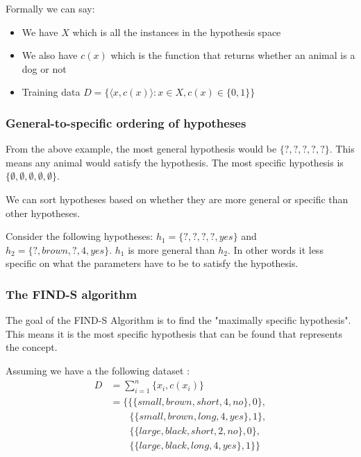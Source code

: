\documentclass[10pt,a4paper]{article}
\begin{document}
Formally we can say:

\begin{itemize}
\item We have $X$ which is all the instances in the hypothesis space
\item We also have $c(x)$ which is the function that returns whether an animal is a dog or not
\item Training data $ D = \{ \langle x,c(x) \rangle : x \in X, c(x) \in \{0,1\}\}$
\end{itemize}

\citep{stan}

\subsubsection{General-to-specific ordering of hypotheses}

From the above example, the most general hypothesis would be $\{?,?,?,?,?\}$. This means any animal would satisfy the hypothesis. The most specific hypothesis is $\{\emptyset,\emptyset,\emptyset,\emptyset,\emptyset\}$. 

We can sort hypotheses based on whether they are more general or specific than other hypotheses.

Consider the following hypotheses: $h_1 = \{?,?,?,?,yes\}$ and $h_2 = \{?,brown,?,4,yes\}$. $h_1$ is more general than $h_2$. In other words it less specific on what the parameters have to be to satisfy the hypothesis. 

\citep{Riedmiller}
\subsubsection{The FIND-S algorithm }
The goal of the FIND-S Algorithm is to find the "maximally specific hypothesis". This means it is the most specific hypothesis that can be found that represents the concept.

Assuming we have a the following dataset : 
\begin{equation}
\label{dataset}
\begin{split}
D &= \sum_{i=1}^n\{x_i,c(x_i)\}\\ 
  &= \{        \{\{ small, brown, short, 4, no\}, 0\},\\
  & \quad\quad \{\{ small, brown, long, 4, yes\}, 1\},\\
  & \quad\quad \{\{ large, black, short, 2, no\}, 0\},\\
  & \quad\quad \{\{ large, black, long, 4, yes\}, 1\}
     \}
\end{split}
\end{equation} 
\end{document}
